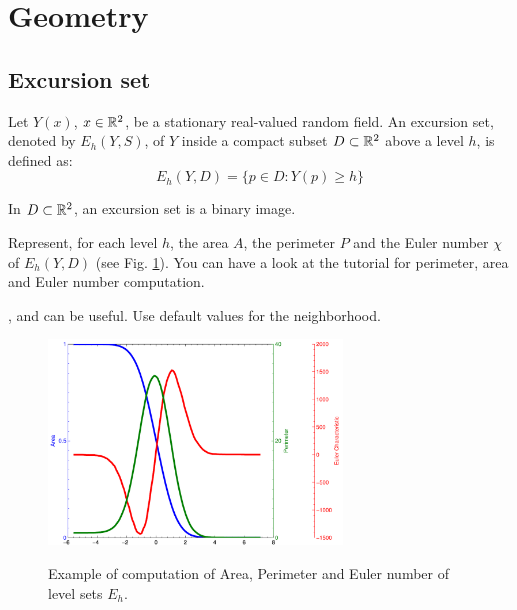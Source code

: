 \section{Geometry}
\subsection{Excursion set}
Let $Y(x)$, $x\in{\mathbb{R}}^2$, be a stationary real-valued random field. An excursion set, denoted by $E_h(Y, S)$, of $Y$ inside a compact subset $D\subset {\mathbb{R}}^2$ above a level $h$, is defined as:
$$E_h(Y,D) = \{ p\in D: Y(p)\geq h\}$$

In $D\subset{\mathbb{R}}^2$, an excursion set is a binary image.

\begin{qbox}
Represent, for each level $h$, the area $A$, the perimeter $P$ and the Euler number $\chi$ of $E_h(Y,D)$ (see Fig. \ref{fig:mf}). You can have a look at the tutorial  for perimeter, area and Euler number computation.
\end{qbox}

\begin{mcomment}
\begin{mremark}
,  and  can be useful. Use default values for the neighborhood.
\end{mremark}
\end{mcomment}

\vspace*{-8pt}

 \begin{figure}[H]
   \centering\caption{Example of computation of Area, Perimeter and Euler number of level sets $E_h$.}%
   \includegraphics[width=7.8cm]{gaussian_t_rf_5.pdf}%
   \label{fig:mf}
  \end{figure}

\vspace*{-12pt}


